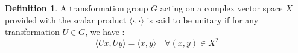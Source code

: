 \documentclass[a4paper,10pt]{article}
\theoremstyle{definition} %
\newtheorem{definition}{Definition}[section]
\theoremstyle{definition} %
\newtheorem{proposition}[definition]{Proposition}
\theoremstyle{definition} %
\theoremstyle{definition} %
\newcommand{\R}{\mathbb{R}}
\newcommand{\0}{\boldsymbol{0}}
\begin{document}

\begin{definition}
    A transformation group $G$ acting on a complex vector space $X$ provided with the scalar product $\langle \cdot,\cdot \rangle$ is said to be unitary if for any transformation $U \in G$, we have :
    \begin{equation*}
        \langle Ux,Uy\rangle = \langle x,y\rangle \quad\forall(x,y) \in X^2
    \end{equation*}
\end{definition}


\end{document}
